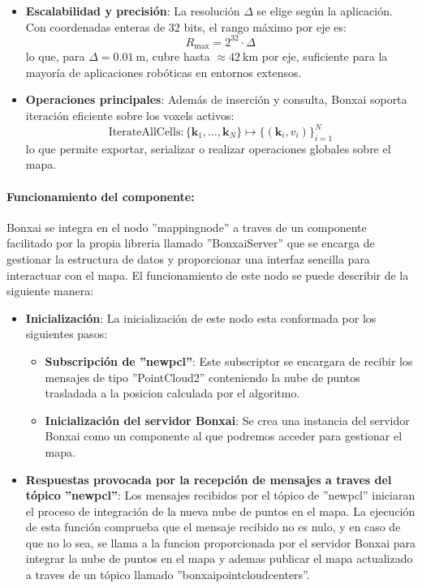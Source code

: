 \documentclass[12pt, a4paper, twoside]{article}
\begin{document}
\begin{itemize}
  \item \textbf{Escalabilidad y precisión}:  
  La resolución \(\Delta\) se elige según la aplicación. Con coordenadas enteras de 32 bits, el rango máximo por eje es:
  \[
  R_{\max} = 2^{32} \cdot \Delta
  \]
  lo que, para \(\Delta = 0.01\ \mathrm{m}\), cubre hasta \(\approx 42\ \mathrm{km}\) por eje, suficiente para la mayoría de aplicaciones robóticas en entornos extensos.
  \item \textbf{Operaciones principales}:  
  Además de inserción y consulta, Bonxai soporta iteración eficiente sobre los voxels activos:
  \[
  \text{IterateAllCells} : \{\mathbf{k}_1, \dots, \mathbf{k}_N\} \mapsto 
  \{(\mathbf{k}_i, v_i)\}_{i=1}^{N}
  \]
  lo que permite exportar, serializar o realizar operaciones globales sobre el mapa.
\end{itemize}

\paragraph{Funcionamiento del componente:}
Bonxai se integra en el nodo ''mapping\textunderscore node'' a traves de un componente facilitado por la propia libreria llamado ''BonxaiServer'' que se encarga de gestionar
la estructura de datos y proporcionar una interfaz sencilla para interactuar con el mapa. El funcionamiento de este nodo se puede describir de la siguiente manera:
\begin{itemize}
  \item \textbf{Inicialización}: La inicialización de este nodo esta conformada por los siguientes pasos:
  \begin{itemize}
    \item \textbf{Subscripción de ''new\textunderscore pcl''}: Este subscriptor se encargara de recibir los mensajes de tipo ''PointCloud2'' conteniendo la nube de puntos 
    trasladada a la posicion calculada por el algoritmo.
    \item \textbf{Inicialización del servidor Bonxai}: Se crea una instancia del servidor Bonxai como un componente al que podremos acceder para gestionar el mapa.
  \end{itemize}
  \item \textbf{Respuestas provocada por la recepción de mensajes a traves del tópico ''new\textunderscore pcl''}:
  Los mensajes recibidos por el tópico de ''new\textunderscore pcl'' iniciaran el proceso de integración de la nueva nube de puntos en el mapa. 
  La ejecución de esta función comprueba que el mensaje recibido no es nulo, y en caso de que no lo sea, se llama a la funcion proporcionada por el servidor Bonxai
  para integrar la nube de puntos en el mapa y ademas publicar el mapa actualizado a traves de un tópico llamado ''bonxai\textunderscore point\textunderscore cloud\textunderscore centers''.
\end{itemize}
\end{document}
